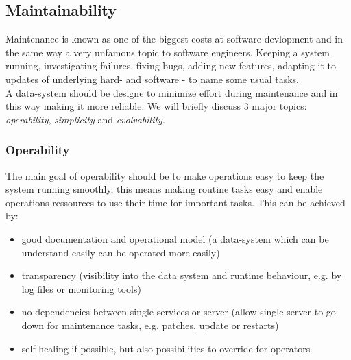 \subsection{Maintainability}
\label{tf_nfreq_maintainability}
Maintenance is known as one of the biggest costs at software devlopment and in the same way a very unfamous topic to software engineers. Keeping a system running, investigating failures, fixing bugs, adding new features, adapting it to updates of underlying hard- and software - to name some usual tasks.\\

A data-system should be designe to minimize effort during maintenance and in this way making it more reliable. We will briefly discuss 3 major topics: \textit{operability}, \textit{simplicity} and \textit{evolvability}.

\subsubsection{Operability}
\label{tf_nfreq_maintainability_operability}
The main goal of operability should be to make operations easy to keep the system running smoothly, this means making routine tasks easy and enable operations ressources to use their time for important tasks. This can be achieved by:
\begin{itemize}
			\item good documentation and operational model (a data-system which can be understand easily can be operated more easily)
			\item transparency (visibility into the data system and runtime behaviour, e.g. by log files or monitoring tools)
			\item no dependencies between single services or server (allow single server to go down for maintenance tasks, e.g. patches, update or restarts)
			\item self-healing if possible, but also possibilities to override for operators\\[0.5 cm]
\end{itemize}


